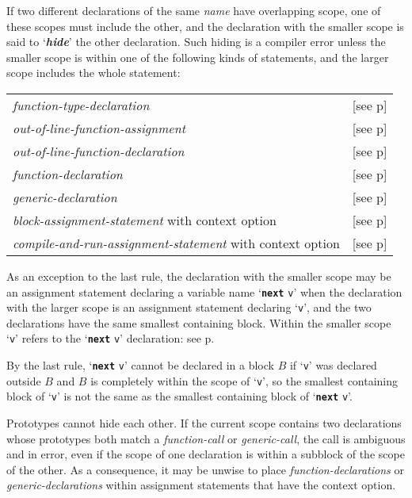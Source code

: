 \documentclass[12pt]{article}
\newcommand{\TT}[1]{{\tt \bfseries #1}}
\newcommand{\mkey}[2]{{\bf \em #1}\index{#1!#2}}
\newcommand{\pagref}[1]{p\pageref{#1}}
\begin{document}
If two different declarations of the same {\em name} have overlapping
scope, one of these scopes must include the other,
and the declaration with the smaller scope is said to 
`\mkey{hide}{declaration}'\label{HIDE} the other declaration.
Such hiding is a compiler error unless the smaller scope
is within one of the following kinds of statements, and
the larger scope includes the whole statement:
\begin{center}
\begin{tabular}{ll}
{\em function-type-declaration}
    & [see \pagref{FUNCTION-TYPE-DECLARATION}] \\
{\em out-of-line-function-assignment}
    & [see \pagref{OUT-OF-LINE-FUNCTION-ASSIGNMENT}] \\
{\em out-of-line-function-declaration}
    & [see \pagref{OUT-OF-LINE-FUNCTION-DECLARATION}] \\
{\em function-declaration}
    & [see \pagref{FUNCTION-DECLARATION}] \\
{\em generic-declaration}
    & [see \pagref{GENERIC-DECLARATION}] \\
{\em block-assignment-statement} with context option
    & [see \pagref{BLOCK-ASSIGNMENT-STATEMENTS}] \\
{\em compile-and-run-assignment-statement} with context option
    & [see \pagref{COMPILE-AND-RUN-ASSIGNMENT-STATEMENTS}] \\
\end{tabular}\label{HIDING-EXCEPTIONS}
\end{center}

As an exception to the last rule, the declaration with the
smaller scope may be an assignment statement declaring
a variable name `\TT{next} {\tt v}' when the declaration
with the larger scope is an assignment statement
declaring `{\tt v}', and the two declarations have the
same smallest containing block.
Within the smaller scope `{\tt v}' refers to the
`\TT{next} {\tt v}' declaration: see \pagref{NEXT}.

By the last rule,
`\TT{next} {\tt v}' cannot be declared in a block $B$ if `{\tt v}' was
declared outside $B$ and $B$ is completely within
the scope of `{\tt v}', so the smallest containing block of
`{\tt v}' is not the same as the smallest containing block of
`\TT{next} {\tt v}'.

Prototypes cannot hide each other.  If the
current scope contains two declarations whose prototypes
both match a {\em function-call} or {\em generic-call},
the call is ambiguous and
in error, even if the scope of one declaration is within
a subblock of the scope of the other.
As a consequence, it may be unwise to place {\em function-declarations}
or {\em generic-declarations}
within assignment statements that have the context option.
\end{document}
